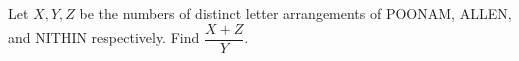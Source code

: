 Let $X,Y,Z$ be the numbers of distinct letter arrangements of POONAM, ALLEN, and NITHIN respectively. Find $\dfrac{X+Z}{Y}$.
